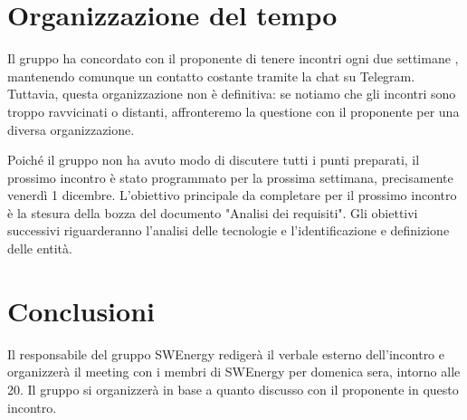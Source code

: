 \section{Organizzazione del tempo}

Il gruppo ha concordato con il proponente di tenere incontri ogni due settimane
, mantenendo comunque un contatto costante tramite la chat su Telegram.
Tuttavia, questa organizzazione non è definitiva: se notiamo che gli incontri
sono troppo ravvicinati o distanti, affronteremo la questione con il
proponente per una diversa organizzazione.

Poiché il gruppo non ha avuto modo di discutere tutti i punti preparati, il
prossimo incontro è stato programmato per la prossima settimana, precisamente
venerdì 1 dicembre. L'obiettivo principale da completare per il prossimo
incontro è la stesura della bozza del documento "Analisi dei requisiti". Gli
obiettivi successivi riguarderanno l'analisi delle tecnologie e
l'identificazione e definizione delle entità.

\section{Conclusioni}

Il responsabile del gruppo SWEnergy redigerà il verbale esterno dell'incontro 
e organizzerà il meeting con i membri di SWEnergy per domenica sera, intorno 
alle 20. Il gruppo si organizzerà in base a quanto discusso con il proponente 
in questo incontro.
